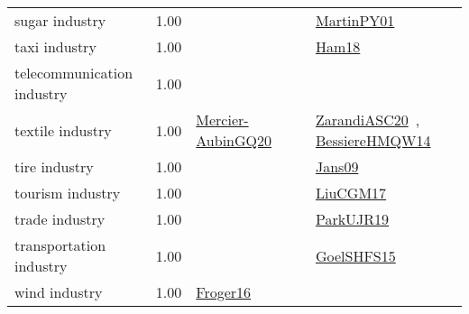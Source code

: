 {\begin{longtable}{p{3cm}r>{\raggedright\arraybackslash}p{6cm}>{\raggedright\arraybackslash}p{6cm}>{\raggedright\arraybackslash}p{8cm}}
\index{sugar industry}\index{Industries!sugar industry}sugar industry &  1.00 &  &  & \href{../works/MartinPY01.pdf}{MartinPY01}~\cite{MartinPY01}\\
\index{taxi industry}\index{Industries!taxi industry}taxi industry &  1.00 &  &  & \href{../works/Ham18.pdf}{Ham18}~\cite{Ham18}\\
\index{telecommunication industry}\index{Industries!telecommunication industry}telecommunication industry &  1.00 &  &  & \\
\index{textile industry}\index{Industries!textile industry}textile industry &  1.00 & \href{../works/Mercier-AubinGQ20.pdf}{Mercier-AubinGQ20}~\cite{Mercier-AubinGQ20} &  & \href{../works/ZarandiASC20.pdf}{ZarandiASC20}~\cite{ZarandiASC20}, \href{../works/BessiereHMQW14.pdf}{BessiereHMQW14}~\cite{BessiereHMQW14}\\
\index{tire industry}\index{Industries!tire industry}tire industry &  1.00 &  &  & \href{../works/Jans09.pdf}{Jans09}~\cite{Jans09}\\
\index{tourism industry}\index{Industries!tourism industry}tourism industry &  1.00 &  &  & \href{../works/LiuCGM17.pdf}{LiuCGM17}~\cite{LiuCGM17}\\
\index{trade industry}\index{Industries!trade industry}trade industry &  1.00 &  &  & \href{../works/ParkUJR19.pdf}{ParkUJR19}~\cite{ParkUJR19}\\
\index{transportation industry}\index{Industries!transportation industry}transportation industry &  1.00 &  &  & \href{../works/GoelSHFS15.pdf}{GoelSHFS15}~\cite{GoelSHFS15}\\
\index{wind industry}\index{Industries!wind industry}wind industry &  1.00 & \href{../works/Froger16.pdf}{Froger16}~\cite{Froger16} &  & \\
\end{longtable}
}

\clearpage
